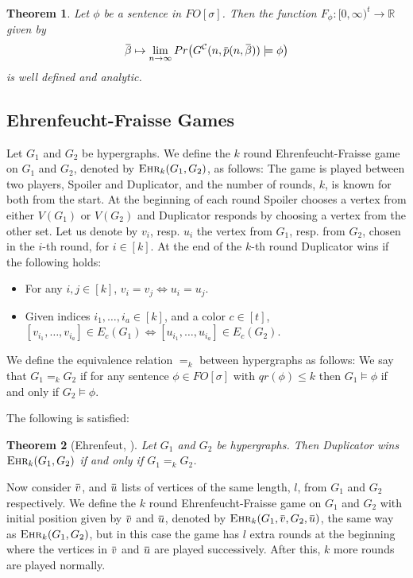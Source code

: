 \documentclass[12pt,notitlepage,a4paper]{article}
\newtheorem{theorem}{Theorem}[section]
\theoremstyle{definition}
\newcommand{\R}{\mathbb{R}}
\newcommand{\Ln}{\lim\limits_{n\to \infty}}
\newcommand{\overbar}[1]{\mkern 1.5mu\overline{\mkern-1.5mu#1\mkern-1.5mu}\mkern 1.5mu}
\newcommand{\ehr}{\textsc{Ehr}}
\begin{document}
\begin{theorem} \label{thm:main}
	Let $\phi$ be a sentence in $FO[\sigma]$. Then
	the function
	$F_\phi: [0,\infty)^{t}
	\rightarrow \R$ given by 
	\[
	\overbar{\beta} \mapsto \Ln Pr\big( G^\mathcal{C}(n,\overbar{p}
	(n,\overbar{\beta})) \models \phi\big)
	\]
	is well defined and analytic. 
\end{theorem}



\subsection{Ehrenfeucht-Fraisse Games}

Let $G_1$ and $G_2$ be hypergraphs. We define the $k$ round 
Ehrenfeucht-Fraisse game on $G_1$ and $G_2$, denoted by
$\ehr_k(G_1,G_2)$, as follows:
The game is played between two players, Spoiler and Duplicator, and
the number of rounds, $k$, is known for both from the start.
At the beginning of each round Spoiler chooses a vertex from either
$V(G_1)$ or $V(G_2)$ and Duplicator responds by choosing a vertex
from the other set.
Let us denote by 
$v_i$, resp. $u_i$ the vertex from $G_1$, resp. from $G_2$, 
chosen in the $i$-th round,
for $i\in [k]$. At the end of the $k$-th round 
Duplicator wins if the following holds:
\begin{itemize}
	\item For any $i,j\in [k]$, $v_i=v_j \iff u_i=u_j$.
	\item Given indices $i_1,\dots, i_a \in [k]$, and a color 
	$c\in [t]$,  
	$[v_{i_1},\dots,v_{i_a}] \in E_c(G_1) \iff [u_{i_1},\dots,u_{i_a}]
	\in E_c(G_2)$.
	
\end{itemize}


We define the equivalence relation $=_k$ between hypergraphs as follows:
We say that $G_1=_k G_2$ if for any sentence $\phi\in 
FO[\sigma]$ with $qr(\phi)\leq k$ then $G_1\models\phi$ if and 
only if $G_2\models\phi$. 
\par

The following is satisfied:

\begin{theorem}
	[Ehrenfeut, \citealp{ehrenfeucht1961application}] Let
	$G_1$ and $G_2$ be hypergraphs.
	Then Duplicator wins $\ehr_k(G_1,G_2)$
	if and only if $G_1=_k G_2$.	
\end{theorem}

Now consider $\overbar{v}$, and $\overbar{u}$ lists of vertices of the same length, $l$,
from $G_1$ and $G_2$ respectively. We define the $k$ round 
Ehrenfeucht-Fraisse game on $G_1$ and $G_2$ with initial position given
by $\overbar{v}$ and $\overbar{u}$, denoted by $\ehr_k(G_1,\overbar{v},G_2,\overbar{u})$,
the same way as $\ehr_k(G_1,G_2)$, but in this case the game has $l$ extra 
rounds at the beginning where the vertices in $\overbar{v}$ and $\overbar{u}$ are 
played successively. After this, $k$ more rounds are played normally. \par
\end{document}
